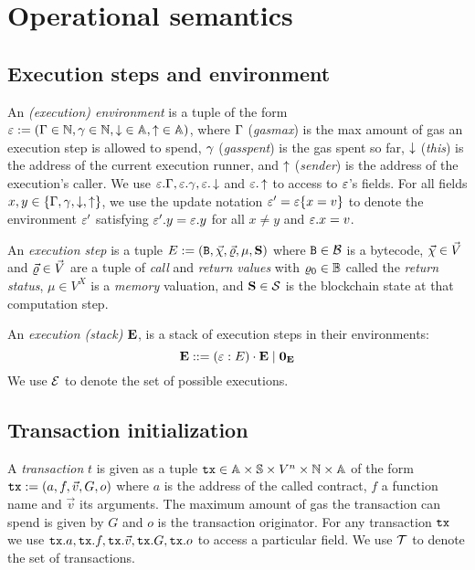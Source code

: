 \documentclass[14pt]{extarticle}
\begin{document}
\section{Operational semantics}

\subsection{Execution steps and environment}

An \emph{(execution) environment} is a tuple of the form $\varepsilon:=(\Gamma\in\mathbb{N},\gamma\in\mathbb{N},\mathop{\downarrow}\in\mathbb{A},\mathop{\uparrow}\in\mathbb{A})$, where $\Gamma$ (\emph{gasmax}) is the max amount of gas an execution step is allowed to spend, $\gamma$ (\emph{gasspent}) is the gas spent so far, $\mathop{\downarrow}$ (\emph{this}) is the address of the current execution runner, and $\mathop{\uparrow}$ (\emph{sender}) is the address of the execution's caller. We use $\varepsilon.\Gamma, \varepsilon.\gamma, \varepsilon.\mathop{\downarrow}$ and $\varepsilon.\mathop{\uparrow}$ to access to $\varepsilon$'s fields. For all fields $x,y\in\{\Gamma,\gamma,\mathop{\downarrow},\mathop{\uparrow}\}$, we use the update notation $\varepsilon'=\varepsilon\{x= v\}$ to denote the environment $\varepsilon'$ satisfying $\varepsilon'.y = \varepsilon.y$ for all $x\neq y$ and $\varepsilon.x=v$. 

An \emph{execution step} is a tuple $E:=(\mathtt{B}, \vec{\chi},\vec{\varrho}, \mu, \mathbf{S})$ where $\mathtt{B}\in\mathcal{B}$ is a bytecode, $\vec{\chi}\in \vec V$ and $\vec{\varrho}\in\vec V$ are a tuple of \emph{call} and \emph{return values} with $\varrho_0\in\mathbb{B}$ called the \emph{return status}, $\mu\in V^X$ is a \emph{memory} valuation, and $\mathbf{S}\in\mathcal{S}$ is the blockchain state at that computation step.

An \emph{execution (stack)} $\mathbf{E}$, is a stack of execution steps in their environments:
$$
\mathbf{E} ::= (\varepsilon:E)\cdot\mathbf{E} \mid \mathbf{0}_{\mathbf{E}}
$$
We use $\mathcal{E}$ to denote the set of possible executions.
\subsection{Transaction initialization}
A \emph{transaction} $t$ is given as a tuple $\mathtt{tx}\in \mathbb{A}\times\mathbb{S}\times V^n\times \mathbb{N}\times \mathbb{A}$ of the form $\mathtt{tx}:=(a,f,\vec v, G, o)$ where $a$ is the address of the called contract, $f$ a function name and $\vec v$ its arguments. The maximum amount of gas the transaction can spend is given by $G$ and $o$ is the transaction originator. For any transaction $\mathtt{tx}$ we use 
$\mathtt{tx}.a, \mathtt{tx}.f, \mathtt{tx}.{\vec v},\mathtt{tx}.G,\mathtt{tx}.o$ to access a particular field.
We use $\mathcal{T}$ to denote the set of transactions.
\end{document}
